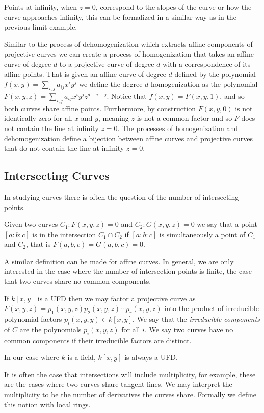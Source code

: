 Points at infinity, when $z=0$, correspond to the slopes of the curve or how the curve approaches infinity, this can be formalized in a similar way as in the previous limit example.

Similar to the process of dehomogenization which extracts affine components of projective curves we can create a process of homogenization that takes an affine curve of degree $d$ to a projective curve of degree $d$ with a correspondence of its affine points. That is given an affine curve of degree $d$ defined by the polynomial $f(x,y)=\sum_{i,j}a_{ij}x^iy^j$ we define the degree $d$ homogenization as the polynomial $F(x,y,z)=\sum_{i,j}a_{ij}x^iy^jz^{d-i-j}$. Notice that $f(x,y)=F(x,y,1)$, and so both curves share affine points. Furthermore, by construction $F(x,y,0)$ is not identically zero for all $x$ and $y$, meaning $z$ is not a common factor and so $F$ does not contain the line at infinity $z=0$. The processes of homogenization and dehomogenization define a bijection between affine curves and projective curves that do not contain the line at infinity $z=0$.

\subsection{Intersecting Curves}
In studying curves there is often the question of the number of intersecting points.
\begin{definition}
    Given two curves $C_1:F(x,y,z)=0$ and $C_2:G(x,y,z)=0$ we say that a point $[a:b:c]$ is in the intersection $C_1\cap C_2$ if $[a:b:c]$ is simultaneously a point of $C_1$ and $C_2$, that is $F(a,b,c)=G(a,b,c)=0$.
\end{definition}
A similar definition can be made for affine curves. In general, we are only interested in the case where the number of intersection points is finite, the case that two curves share no common components.
\begin{definition}
    If $k[x,y]$ is a UFD then we may factor a projective curve as $F(x,y,z)=p_1(x,y,z)p_2(x,y,z)\cdots p_r(x,y,z)$ into the product of irreducible polynomial factors $p_i(x,y,y)\in k[x,y]$. We say that the \textit{irreducible components} of $C$ are the polynomials $p_i(x,y,z)$ for all $i$. We say two curves have no common components if their irreducible factors are distinct.
\end{definition}
In our case where $k$ is a field, $k[x,y]$ is always a UFD.

It is often the case that intersections will include multiplicity, for example, these are the cases where two curves share tangent lines. We may interpret the multiplicity to be the number of derivatives the curves share. Formally we define this notion with local rings.


